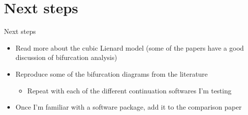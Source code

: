\documentclass{beamer}
\begin{document}
\section{Next steps}
\label{sec:orgd366600}
\begin{frame}[label={sec:org48f2044}]{Next steps}
\begin{itemize}
\item Read more about the cubic Lienard model (some of the papers have a good discussion of bifurcation analysis)
\item Reproduce some of the bifurcation diagrams from the literature
\begin{itemize}
\item Repeat with each of the different continuation softwares I'm testing
\end{itemize}
\item Once I'm familiar with a software package, add it to the comparison paper
\end{itemize}
\end{frame}
\end{document}
